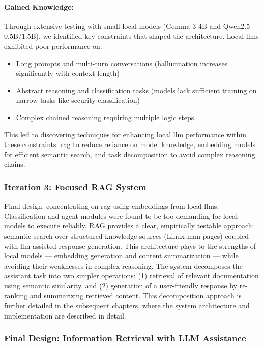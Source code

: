 \paragraph{Gained Knowledge:} Through extensive testing with small local models
(Gemma 3 4B and Qwen2.5 0.5B/1.5B), we identified key constraints that shaped
the architecture. Local \glspl{llm} exhibited poor performance on:
\begin{itemize}
  \item Long prompts and multi-turn conversations (hallucination increases
      significantly with context length)
  \item Abstract reasoning and classification tasks (models lack sufficient
      training on narrow tasks like security classification)
  \item Complex chained reasoning requiring multiple logic steps
\end{itemize}
This led to discovering techniques for enhancing local \gls{llm} performance
within these constraints: \gls{rag} to reduce reliance on model knowledge,
embedding models for efficient semantic search, and task decomposition to avoid
complex reasoning chains.

\subsubsection{Iteration 3: Focused RAG System}

Final design: concentrating on \gls{rag} using
embeddings from local \glspl{llm}. Classification and agent modules were found
to be too demanding for local models to execute reliably. RAG provides a clear,
empirically testable approach: semantic search over structured knowledge sources
(Linux man pages) coupled with \gls{llm}-assisted response generation. This
architecture plays to the strengths of local models --- embedding generation and
content summarization --- while avoiding their weaknesses in complex reasoning.
The system decomposes the assistant task into two simpler operations: (1)
retrieval of relevant documentation using semantic similarity, and (2)
generation of a user-friendly response by re-ranking and summarizing retrieved
content. This decomposition approach is further detailed in the subsequent
chapters, where the system architecture and implementation are described in
detail.

\subsubsection{Final Design: Information Retrieval with LLM Assistance}


